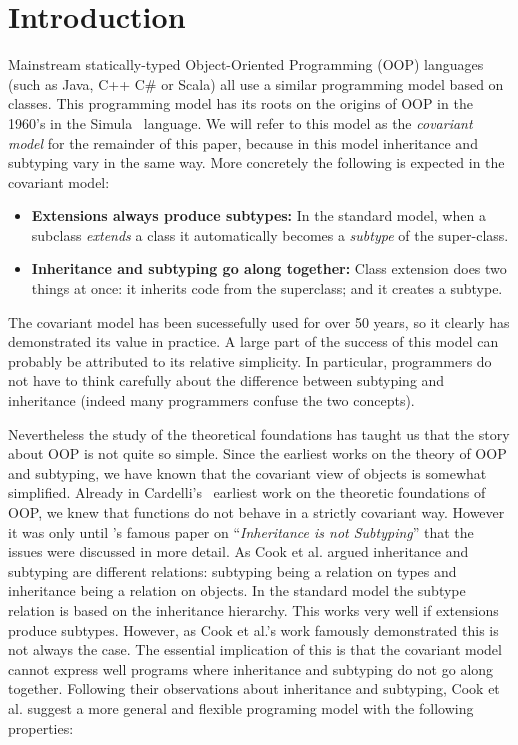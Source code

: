 \section{Introduction}
\label{sec:intro}


Mainstream statically-typed Object-Oriented Programming (OOP) languages (such as Java,
C++ C\# or Scala) all use a similar programming model based on
classes. This programming model has its roots on the
origins of OOP in the 1960's in the Simula~\cite{dahl1967simula} language.
We will refer to this model as the \emph{covariant model} for the
remainder of this paper, because in this model inheritance and
subtyping vary in the same way. More concretely
the following is expected in the covariant model:

\begin{itemize}

\item {\bf Extensions always produce subtypes:} In the standard model, when a 
subclass \emph{extends} a class it automatically becomes a 
\emph{subtype} of the super-class. 

\item{\bf Inheritance and subtyping go along together:}
Class extension does two things at once: it inherits code from the
superclass; and it creates a subtype. 

\end{itemize}

The covariant model has been sucessefully used for over 50 years,
so it clearly has demonstrated its value in practice. 
A large part of the success of this model can probably be attributed 
to its relative simplicity. In particular, programmers do not have to think carefully 
about the difference between subtyping and inheritance (indeed many
programmers confuse the two concepts). 

Nevertheless the study of the theoretical foundations has
taught us that the story about OOP is not quite so simple. Since the
earliest works on the theory of OOP and subtyping, we have known that 
the covariant view of objects is somewhat simplified. Already in
Cardelli's~\cite{} earliest work on the theoretic foundations of OOP,
we knew that functions do not behave in a strictly covariant way. 
However it was only until \citet{cook1989inheritance}'s famous paper on
``\emph{Inheritance is not Subtyping}'' that the issues were discussed 
in more detail. As Cook et al. argued inheritance and
subtyping are different relations: subtyping being a relation on types 
and inheritance being a relation on objects. In the standard model 
the subtype relation is based on the inheritance hierarchy. This 
works very well if extensions produce 
subtypes. However, as Cook et al.'s work famously demonstrated 
this is not always the case. The essential implication of this is that
the covariant model cannot express well programs where inheritance 
and subtyping do not go along together. Following their observations about 
inheritance and subtyping, Cook et al. suggest a more general and 
flexible programing model with the following properties:

